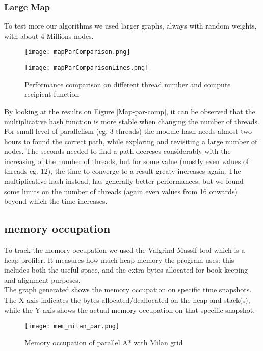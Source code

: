 \subsubsection{Large Map}

To test more our algorithms we used larger graphs, always with random weights, with about 4 Millions nodes.

\begin{figure}
    \centering
    \texttt{[image: mapParComparison.png]}
    \label{Map-par-comp}
    
    \texttt{[image: mapParComparisonLines.png]}
    \label{Map-par-comp-lines}
    \caption{Performance comparison on different thread number and compute recipient function}
\end{figure}


By looking at the results on Figure \ref{Map-par-comp}, it can be observed that the multiplicative hash function is more stable when changing the number of threads.
For small level of parallelism (eg. 3 threads) the module hash needs almost two hours to found the correct path, while exploring and revisiting a large number of nodes.
The seconds needed to find a path decreses considerably with the increasing of the number of threads, but for some value (mostly even values of threads eg. 12), the time to converge to a result greaty increases again.
The multiplicative hash instead, has generally better performances, but we found some limits on the number of threads (again even values from 16 onwards) beyond which the time increases.


\subsection{memory occupation}

To track the memory occupation we used the Valgrind-Massif tool which is a heap profiler. It measures how much heap memory the program uses: this includes both the useful space,
and the extra bytes allocated for book-keeping and alignment purposes.
\\
The graph generated shows the memory occupation on specific time snapshots. The X axis indicates the bytes allocated/deallocated on the heap and stack(s), while the Y axis shows the actual memory occupation on that specific snapshot.


\begin{figure}
    \centering
    \texttt{[image: mem\_milan\_par.png]}
    \caption{Memory occupation of parallel A* with Milan grid}
    \label{mem-par-milan}
\end{figure}


